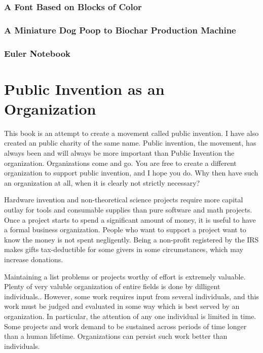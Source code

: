 \documentclass[
	fontsize=10pt, %
	twoside=false, %
	secnumdepth=1, %
]{kaobook}
\begin{document}
\subsection{A Font Based on Blocks of Color}

\subsection{A Miniature Dog Poop to Biochar Production Machine}

\subsection{Euler Notebook}




\chapter{Public Invention as an Organization}


This book is an attempt to create a movement called public invention.
I have also created an public charity of the same name.
Public invention, the movement, has always been and will always be more important than Public Invention the organization.
Organizations come and go.
You are free to create a different organization to support public invention, and I hope you do.
Why then have such an organization at all, when it is clearly not strictly necessary?

Hardware invention and non-theoretical science projects require more capital outlay
for tools and consumable supplies than pure software and math projects.
Once a project starts to spend a significant amount of money, it is useful to have a formal business organization.
People who want to support a project want to know the money is not spent negligently.
Being a non-profit registered by the IRS makes gifts tax-deductible for some givers in some circumstances,
which may increase donations.

Maintaining a list problems or projects worthy of effort is extremely valuable.
Plenty of very valuble organization of entire fields is done by dilligent individuals..
However, some work requires input from several individuals, and this work must be judged and evaluated
in some way which is best served by an organization.
In particular, the attention of any one
individual is limited in time.
Some projects and work demand to be sustained across periods of time longer than a human lifetime.
Organizations can persist such work better than individuals.
\end{document}
